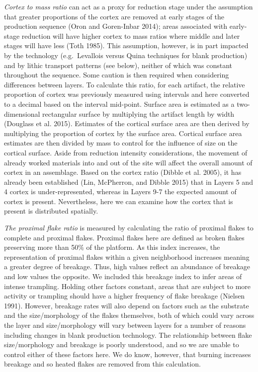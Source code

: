 \documentclass[smallextended]{svjour3}       %
\begin{document}
\emph{Cortex to mass ratio} can act as a proxy for reduction stage under
the assumption that greater proportions of the cortex are removed at
early stages of the production sequence (Oron and Goren-Inbar 2014);
areas associated with early-stage reduction will have higher cortex to
mass ratios where middle and later stages will have less (Toth 1985).
This assumption, however, is in part impacted by the technology
(e.g.~Levallois versus Quina techniques for blank production) and by
lithic transport patterns (see below), neither of which was constant
throughout the sequence. Some caution is then required when considering
differences between layers. To calculate this ratio, for each artifact,
the relative proportion of cortex was previously measured using
intervals and here converted to a decimal based on the interval
mid-point. Surface area is estimated as a two-dimensional rectangular
surface by multiplying the artifact length by width (Douglass et al.
2015). Estimates of the cortical surface area are then derived by
multiplying the proportion of cortex by the surface area. Cortical
surface area estimates are then divided by mass to control for the
influence of size on the cortical surface. Aside from reduction
intensity considerations, the movement of already worked materials into
and out of the site will affect the overall amount of cortex in an
assemblage. Based on the cortex ratio (Dibble et al. 2005), it has
already been established (Lin, McPherron, and Dibble 2015) that in
Layers 5 and 4 cortex is under-represented, whereas in Layers 9-7 the
expected amount of cortex is present. Nevertheless, here we can examine
how the cortex that is present is distributed spatially.

\emph{The proximal flake ratio} is measured by calculating the ratio of
proximal flakes to complete and proximal flakes. Proximal flakes here
are defined as broken flakes preserving more than 50\% of the platform.
As this index increases, the representation of proximal flakes within a
given neighborhood increases meaning a greater degree of breakage. Thus,
high values reflect an abundance of breakage and low values the
opposite. We included this breakage index to infer areas of intense
trampling. Holding other factors constant, areas that are subject to
more activity or trampling should have a higher frequency of flake
breakage (Nielsen 1991). However, breakage rates will also depend on
factors such as the substrate and the size/morphology of the flakes
themselves, both of which could vary across the layer and
size/morphology will vary between layers for a number of reasons
including changes in blank production technology. The relationship
between flake size/morphology and breakage is poorly understood, and so
we are unable to control either of these factors here. We do know,
however, that burning increases breakage and so heated flakes are
removed from this calculation.
\end{document}
